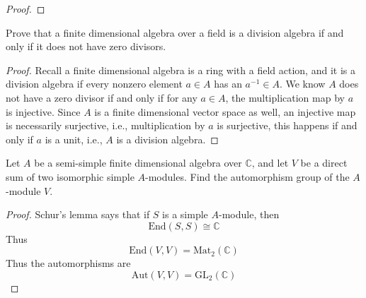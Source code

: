 \documentclass[openany]{book}
\newcommand{\C}{\mathbb{C}}
\begin{document}
\begin{proof}
    




\end{proof}

\begin{prob}
    Prove that a finite dimensional algebra over a field is a division algebra if and only if it does not have zero divisors.
\end{prob}
\begin{proof}
    Recall a finite dimensional algebra is a ring with a field action, and it is a division algebra if every nonzero element $a\in A$ has an $a^{-1}\in A$. We know $A$ does not have a zero divisor if and only if for any $a\in A$, the multiplication map by $a$ is injective. Since $A$ is a finite dimensional vector space as well, an injective map is necessarily surjective, i.e., multiplication by $a$ is surjective, this happens if and only if $a$ is a unit, i.e., $A$ is a division algebra.
\end{proof}


\begin{prob}
    Let \(A\) be a semi-simple finite dimensional algebra over \(\mathbb{C}\), and let \(V\) be a direct sum of two isomorphic simple \(A\)-modules. Find the automorphism group of the \(A\)-module \(V\).
\end{prob}
\begin{proof}
    Schur's lemma says that if $S$ is a simple $A$-module, then 
    \begin{equation*}
        \text{End}(S,S)\cong\C
    \end{equation*}
    Thus 
    \begin{equation*}
        \text{End}(V,V)=\text{Mat}_2(\C)
    \end{equation*}
    Thus the automorphisms are 
    \begin{equation*}
        \text{Aut}(V,V)=\text{GL}_2(\C)
    \end{equation*}
\end{proof}
\end{document}
